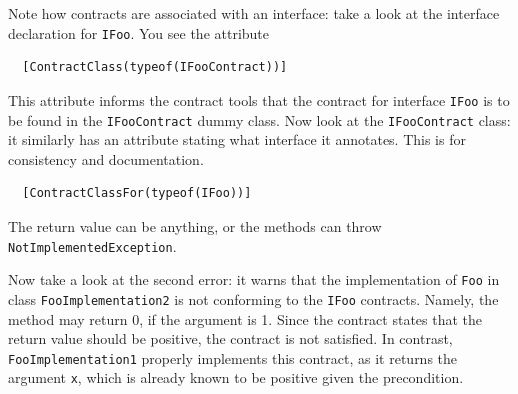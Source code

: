 \documentclass{article}
\newcommand{\code}[1]{\lstinline{#1}}
\begin{document}
Note how contracts are associated with an interface: take a look at
the interface declaration for \code{IFoo}. You see the attribute 
\begin{lstlisting}
  [ContractClass(typeof(IFooContract))]
\end{lstlisting}
This attribute informs the contract tools that the contract for
interface \code{IFoo} is to be found in the \code{IFooContract} dummy
class. Now look at the \code{IFooContract} class: it similarly has an
attribute stating what interface it annotates. This is for consistency
and documentation.
\begin{lstlisting}
  [ContractClassFor(typeof(IFoo))]
\end{lstlisting}
The return value
can be anything, or the methods can throw \code{NotImplementedException}.

Now take a look at the second error: it warns that the implementation
of \code{Foo} in class \code{FooImplementation2} is not conforming to
the \code{IFoo} contracts. Namely, the method may return 0, if the
argument is 1. Since the contract states that the return value should
be positive, the contract is not satisfied. In contrast,
\code{FooImplementation1} properly implements this contract, as it
returns the argument \code{x}, which is already known to be positive
given the precondition.
\end{document}
